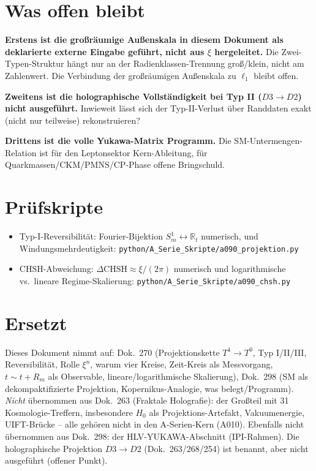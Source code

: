 \section{Was offen bleibt}

\textbf{Erstens ist die großräumige Außenskala in diesem Dokument als
deklarierte externe Eingabe geführt, nicht aus $\xi$ hergeleitet.} Die
Zwei-Typen-Struktur hängt nur an der Radienklassen-Trennung groß/klein, nicht am Zahlenwert. Die Verbindung der großräumigen Außenskala zu $\ell_1$ bleibt offen.

\textbf{Zweitens ist die holographische Vollständigkeit bei Typ II ($D3\to D2$)
nicht ausgeführt.} Inwieweit lässt sich der Typ-II-Verlust über Randdaten exakt
(nicht nur teilweise) rekonstruieren?

\textbf{Drittens ist die volle Yukawa-Matrix Programm.} Die SM-Untermengen-Relation
ist für den Leptonsektor Kern-Ableitung, für Quarkmassen/CKM/PMNS/CP-Phase offene
Bringschuld.

\section{Prüfskripte}

\begin{itemize}[leftmargin=2em,itemsep=2pt,topsep=2pt]
  \item Typ-I-Reversibilität: Fourier-Bijektion $S^1_m\leftrightarrow\mathbb{R}_t$
    numerisch, und Windungsmehrdeutigkeit:
    \texttt{python/A\_Serie\_Skripte/a090\_projektion.py}
  \item CHSH-Abweichung: $\Delta\text{CHSH}\approx\xi/(2\pi)$ numerisch und
    logarithmische vs.\ lineare Regime-Skalierung:
    \texttt{python/A\_Serie\_Skripte/a090\_chsh.py}
\end{itemize}

\section{Ersetzt}

Dieses Dokument nimmt auf: Dok.~270 (Projektionskette $T^4\to T^0$, Typ I/II/III,
Reversibilität, Rolle $\xi^n$, warum vier Kreise, Zeit-Kreis als Messvorgang,
$t\sim t+R_m$ als Observable, lineare/logarithmische Skalierung), Dok.~298 (SM als
dekompaktifizierte Projektion, Kopernikus-Analogie, was belegt/Programm).
\emph{Nicht} übernommen aus Dok.~263 (Fraktale Holografie): der Großteil mit 31
Kosmologie-Treffern, insbesondere $H_0$ als Projektions-Artefakt, Vakuumenergie,
UIFT-Brücke -- alle gehören nicht in den A-Serien-Kern (A010). Ebenfalls nicht
übernommen aus Dok.~298: der HLV-YUKAWA-Abschnitt (IPI-Rahmen). Die
holographische Projektion $D3\to D2$ (Dok.~263/268/254) ist benannt, aber nicht
ausgeführt (offener Punkt).

